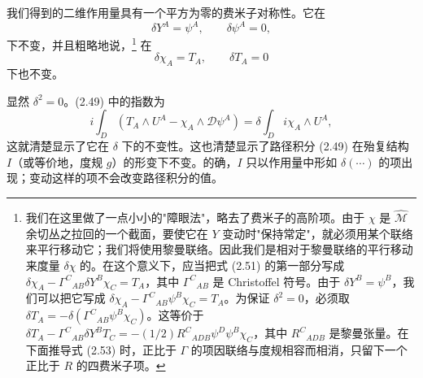 \documentclass[11pt,a4paper,UTF8]{ctexart}
\theoremstyle{plain}
\theoremstyle{definition}
\begin{document}
我们得到的二维作用量具有一个平方为零的费米子对称性。它在
\begin{equation}
    \delta Y^A=\psi^A,\qquad \delta\psi^A=0,
    \tag{2.50}
\end{equation}
下不变，并且粗略地说，\footnote{我们在这里做了一点小小的"障眼法"，略去了费米子的高阶项。由于 $\chi$ 是 $\widehat{\mathcal{M}}$ 余切丛之拉回的一个截面，要使它在 $Y$ 变动时"保持常定"，就必须用某个联络来平行移动它；我们将使用黎曼联络。因此我们是相对于黎曼联络的平行移动来度量 $\delta\chi$ 的。在这个意义下，应当把式 (2.51) 的第一部分写成 $\delta\chi_A-\Gamma^C{}_{AB}\delta Y^B\chi_C=T_A$，其中 $\Gamma^C{}_{AB}$ 是 Christoffel 符号。由于 $\delta Y^B=\psi^B$，我们可以把它写成 $\delta\chi_A-\Gamma^C{}_{AB}\psi^B\chi_C=T_A$。为保证 $\delta^2=0$，必须取 $\delta T_A=-\delta(\Gamma^C{}_{AB}\psi^B\chi_C)$。这等价于 $\delta T_A-\Gamma^C{}_{AB}\delta Y^BT_C=-(1/2)R^C{}_{ADB}\psi^D\psi^B\chi_C$，其中 $R^C{}_{ADB}$ 是黎曼张量。在下面推导式 (2.53) 时，正比于 $\Gamma$ 的项因联络与度规相容而相消，只留下一个正比于 $R$ 的四费米子项。} 在
\begin{equation}
    \delta\chi_A=T_A,\qquad \delta T_A=0
    \tag{2.51}
\end{equation}
下也不变。


显然 $\delta^2=0$。(2.49) 中的指数为
\begin{equation}
    i\int_D\left(T_A\wedge U^A-\chi_A\wedge\mathcal{D}\psi^A\right)=\delta\int_D i\chi_A\wedge U^A,
    \tag{2.52}
\end{equation}
这就清楚显示了它在 $\delta$ 下的不变性。这也清楚显示了路径积分 (2.49) 在殆复结构 $I$（或等价地，度规 $g$）的形变下不变。的确，$I$ 只以作用量中形如 $\delta(\cdots)$ 的项出现；变动这样的项不会改变路径积分的值。
\end{document}
